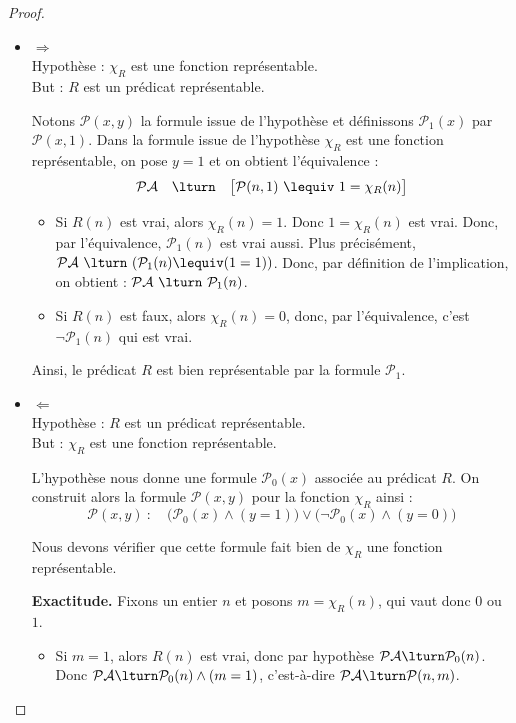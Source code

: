 \documentclass[11pt,class=report,crop=false]{standalone}
\begin{document}
\begin{proof}
    ~
    \begin{itemize}
        \item $\Rightarrow$\\
    Hypothèse : $\chi_R$ est une fonction représentable. \\
    But : $R$ est un prédicat représentable.

    Notons $\mathcal{P}(x,y)$ la formule issue de l'hypothèse et définissons $\mathcal{P}_1(x)$ par $\mathcal{P}(x, 1)$. Dans la formule issue de l'hypothèse \og{}$\chi_R$ est une fonction représentable\fg{}, on pose $y=1$ et on obtient l'équivalence :
    \[ \mathcal{PA} \quad \lturn \quad \big[ \mathcal{P}(n, 1) \ \lequiv \ 1 = \chi_R(n) \big] \]

    \begin{itemize}
        \item Si $R(n)$ est vrai, alors $\chi_R(n)=1$. Donc $1 = \chi_R(n)$ est vrai. Donc, par l'équivalence, $\mathcal{P}_1(n)$ est vrai aussi. 
        Plus précisément, $\mathcal{PA} \ \lturn \ (\mathcal{P}_1(n) \lequiv (1=1))$. 
        Donc, par définition de l'implication, on obtient : 
        $\mathcal{PA} \ \lturn \ \mathcal{P}_1(n)$.

        \item Si $R(n)$ est faux, alors $\chi_R(n)=0$, donc, par l'équivalence, c'est $\lnot \mathcal{P}_1(n)$ qui est vrai. 
    \end{itemize}
    Ainsi, le prédicat $R$ est bien représentable par la formule $\mathcal{P}_1$.        

        
        \item $\Leftarrow$\\
    Hypothèse : $R$ est un prédicat représentable. \\
    But : $\chi_R$ est une fonction représentable.

    L'hypothèse nous donne une formule $\mathcal{P}_0(x)$ associée au prédicat $R$. 
    On construit alors la formule $\mathcal{P}(x,y)$ pour la fonction $\chi_R$ ainsi :
    \[ \mathcal{P}(x,y) \ : \quad \big( \mathcal{P}_0(x) \land (y = 1) \big) \lor \big( \lnot \mathcal{P}_0(x) \land (y = 0) \big) \]
    
    Nous devons vérifier que cette formule fait bien de $\chi_R$ une fonction représentable.
    
    \textbf{Exactitude.}
    Fixons un entier $n$ et posons $m = \chi_R(n)$, qui vaut donc $0$ ou $1$.
    \begin{itemize}
        \item Si $m=1$, alors $R(n)$ est vrai, donc par hypothèse $\mathcal{PA} \lturn \mathcal{P}_0(n)$. 
        Donc $\mathcal{PA} \lturn \mathcal{P}_0(n) \land (m = 1)$, c'est-à-dire $\mathcal{PA} \lturn \mathcal{P}(n, m)$.
        

\end{itemize}
\end{itemize}
\end{proof}
\end{document}
